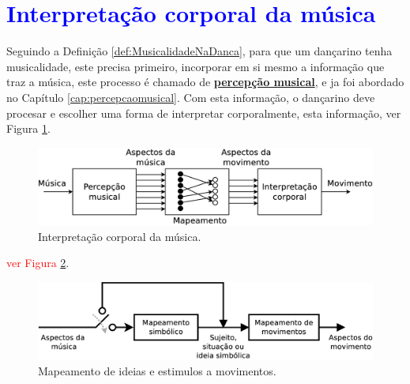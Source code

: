 \section{\textcolor{blue}{Interpretação corporal da música}}

Seguindo a Definição \ref{def:MusicalidadeNaDanca},
para que um dançarino tenha musicalidade, este precisa primeiro,
incorporar em si mesmo a informação que traz a música, 
este processo é chamado de \hyperref[cap:percepcaomusical]{\textbf{percepção musical}}, 
e ja foi abordado no Capítulo \ref{cap:percepcaomusical}.
Com esta informação, o dançarino deve procesar e escolher uma forma de interpretar corporalmente,
esta informação, ver Figura \ref{fig:interpretacion-corporal}.
\begin{figure}[!h]
  \centering
    \includegraphics[width=1.00\textwidth]{chapters/cap-musicalidade/interpretacion-corporal.eps}
\caption{Interpretação corporal da música.}
\label{fig:interpretacion-corporal}
\end{figure}


\textcolor{red}{ver Figura \ref{fig:mapeamento}}.
\begin{figure}[!h]
  \centering
    \includegraphics[width=1.00\textwidth]{chapters/cap-musicalidade/mapeamento.eps}
\caption{Mapeamento de ideias e estimulos a movimentos.}
\label{fig:mapeamento}
\end{figure}


